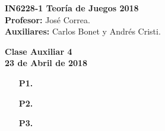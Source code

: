 \documentclass[11pt, spanish]{article}
\theoremstyle{plain}
\begin{document}

\begin{flushleft}
  \textbf{IN6228-1 Teoría de Juegos 2018}
  \\\textbf{Profesor:} José Correa.
  \\\textbf{Auxiliares:} Carlos Bonet y Andrés Cristi.
\end{flushleft}


\begin{center}
  \large{\textbf{Clase Auxiliar 4\\ 23 de Abril de 2018}}
\end{center}




\begin{itemize}
\item[\textbf{P1.}] 

\item[\textbf{P2.}] 

\item[\textbf{P3.}] 

\end{itemize}
\end{document}
